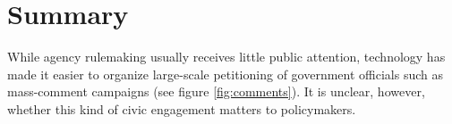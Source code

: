 \documentclass{article}
\begin{document}

\section*{Summary}
\noindent
While agency rulemaking usually receives little public attention, technology has made it easier to organize large-scale petitioning of government officials such as mass-comment campaigns (see figure \ref{fig:comments}). It is unclear, however, whether this kind of civic engagement matters to policymakers.

\end{document}
